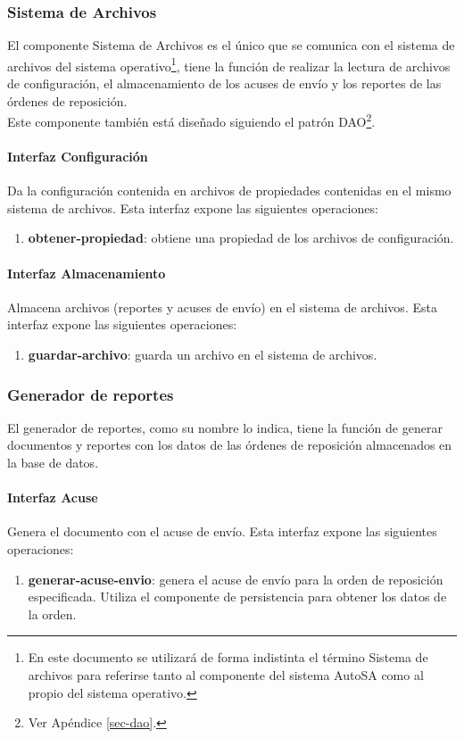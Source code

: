 \subsubsection{Sistema de Archivos}
El componente Sistema de Archivos es el único que se comunica con el sistema de archivos del sistema operativo\footnote{En este documento se utilizará de forma indistinta el término Sistema de archivos para referirse tanto al componente del sistema AutoSA como al propio del sistema operativo.}, tiene la función de realizar la lectura de archivos de configuración, el almacenamiento de los acuses de envío  y los reportes de las órdenes de reposición.\\
Este componente también está diseñado siguiendo el patrón DAO\footnote{Ver Apéndice \ref{sec-dao}.}.
\paragraph{\indent Interfaz Configuración\\}
Da la configuración contenida en archivos de propiedades contenidas en el mismo sistema de archivos. Esta interfaz expone las siguientes operaciones:

\begin{enumerate}
	\item \textbf{obtener-propiedad}: obtiene una propiedad de los archivos de configuración.
\end{enumerate}

\paragraph{\indent Interfaz Almacenamiento\\}
Almacena archivos (reportes y acuses de envío) en el sistema de archivos. Esta interfaz expone las siguientes operaciones:
\begin{enumerate}
	\item \textbf{guardar-archivo}: guarda un archivo en el sistema de archivos.
\end{enumerate}

\subsubsection{Generador de reportes}
El generador de reportes, como su nombre lo indica, tiene la función de generar documentos y reportes con los datos de las órdenes de reposición almacenados en la base de datos. 
\paragraph{\indent Interfaz Acuse\\} Genera el documento con el acuse de envío. Esta interfaz expone las siguientes operaciones:
\begin{enumerate}
	\item \textbf{generar-acuse-envio}: genera el acuse de envío para la orden de reposición especificada. Utiliza el componente de persistencia para obtener los datos de la orden.
\end{enumerate}

